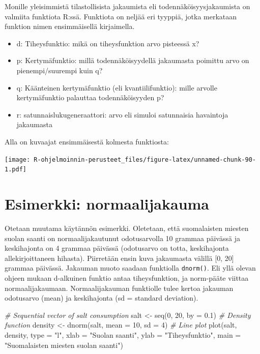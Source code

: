 \documentclass[
]{book}
\newenvironment{Shaded}{\begin{snugshade}}{\end{snugshade}}
\newcommand{\AttributeTok}[1]{\textcolor[rgb]{0.77,0.63,0.00}{#1}}
\newcommand{\CommentTok}[1]{\textcolor[rgb]{0.56,0.35,0.01}{\textit{#1}}}
\newcommand{\DecValTok}[1]{\textcolor[rgb]{0.00,0.00,0.81}{#1}}
\newcommand{\FloatTok}[1]{\textcolor[rgb]{0.00,0.00,0.81}{#1}}
\newcommand{\FunctionTok}[1]{\textcolor[rgb]{0.00,0.00,0.00}{#1}}
\newcommand{\NormalTok}[1]{#1}
\newcommand{\OtherTok}[1]{\textcolor[rgb]{0.56,0.35,0.01}{#1}}
\newcommand{\StringTok}[1]{\textcolor[rgb]{0.31,0.60,0.02}{#1}}
\providecommand{\tightlist}{%
  \setlength{\itemsep}{0pt}\setlength{\parskip}{0pt}}
\begin{document}
Monille yleisimmistä tilastollisista jakaumista eli todennäköisyysjakaumista on valmiita funktiota R:ssä. Funktiota on neljää eri tyyppiä, jotka merkataan funktion nimen ensimmäisellä kirjaimella.

\begin{itemize}
\tightlist
\item
  d: Tiheysfunktio: mikä on tiheysfunktion arvo pisteessä x?
\item
  p: Kertymäfunktio: millä todennäköisyydellä jakaumasta poimittu arvo on pienempi/suurempi kuin q?
\item
  q: Käänteinen kertymäfunktio (eli kvantiilifunktio): mille arvolle kertymäfunktio palauttaa todennäköisyyden p?
\item
  r: satunnaislukugeneraattori: arvo eli simuloi satunnaisia havaintoja jakaumasta
\end{itemize}

Alla on kuvaajat ensimmäisestä kolmesta funktiosta:

\texttt{[image: R-ohjelmoinnin-perusteet\_files/figure-latex/unnamed-chunk-90-1.pdf]}

\hypertarget{esimerkki-normaalijakauma}{%
\section{Esimerkki: normaalijakauma}\label{esimerkki-normaalijakauma}}

Otetaan muutama käytännön esimerkki. Oletetaan, että suomalaisten miesten suolan saanti on normaalijakautunut odotusarvolla 10 grammaa päivässä ja keskihajonta on 4 grammaa päivässä (odotusarvo on totta, keskihajonta allekirjoittaneen hihasta). Piirretään ensin kuva jakaumasta välillä {[}0, 20{]} grammaa päivässä. Jakauman muoto saadaan funktiolla \texttt{dnorm()}. Eli yllä olevan ohjeen mukaan d-alkuinen funktio antaa tiheysfunktion, ja norm-pääte viittaa normaalijakaumaan. Normaalijakauman funktiolle tulee kertoa jakauman odotusarvo (mean) ja keskihajonta (sd = standard deviation).

\begin{Shaded}
\begin{Highlighting}[]
\CommentTok{\# Sequential vector  of salt consumption}
\NormalTok{salt }\OtherTok{\textless{}{-}} \FunctionTok{seq}\NormalTok{(}\DecValTok{0}\NormalTok{, }\DecValTok{20}\NormalTok{, }\AttributeTok{by =} \FloatTok{0.1}\NormalTok{)}
\CommentTok{\# Density function}
\NormalTok{density }\OtherTok{\textless{}{-}} \FunctionTok{dnorm}\NormalTok{(salt, }\AttributeTok{mean =} \DecValTok{10}\NormalTok{, }\AttributeTok{sd =} \DecValTok{4}\NormalTok{)}
\CommentTok{\# Line plot}
\FunctionTok{plot}\NormalTok{(salt, density, }\AttributeTok{type =} \StringTok{"l"}\NormalTok{,}
     \AttributeTok{xlab =} \StringTok{"Suolan saanti"}\NormalTok{, }\AttributeTok{ylab =} \StringTok{"Tiheysfunktio"}\NormalTok{,}
     \AttributeTok{main =} \StringTok{"Suomalaisten miesten suolan saanti"}\NormalTok{)}
\end{Highlighting}
\end{Shaded}
\end{document}

